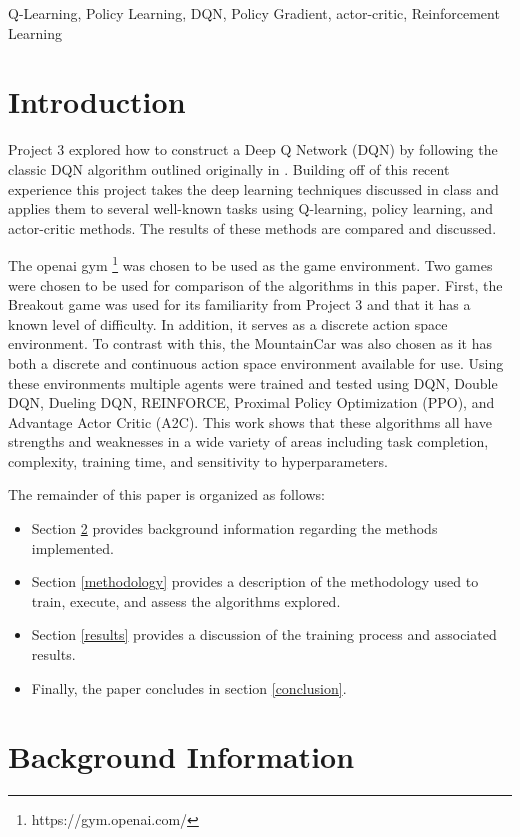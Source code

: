 \documentclass[conference]{IEEEtran}
\begin{document}
\begin{IEEEkeywords}
Q-Learning, Policy Learning, DQN, Policy Gradient, actor-critic, Reinforcement Learning
\end{IEEEkeywords}

\section{Introduction}
Project 3 explored how to construct a Deep Q Network (DQN) by following the classic DQN algorithm outlined originally in \cite{DQNOriginalPaper}.
Building off of this recent experience this project takes the deep learning techniques discussed in class and applies them to several well-known tasks using Q-learning, policy learning, and actor-critic methods.
The results of these methods are compared and discussed.

The openai gym \footnote{https://gym.openai.com/} was chosen to be used as the game environment.
Two games were chosen to be used for comparison of the algorithms in this paper.
First, the Breakout game was used for its familiarity from Project 3 and that it has a known level of difficulty.
In addition, it serves as a discrete action space environment.
To contrast with this, the MountainCar was also chosen as it has both a discrete and continuous action space environment available for use.
Using these environments multiple agents were trained and tested using DQN, Double DQN, Dueling DQN, REINFORCE, Proximal Policy Optimization (PPO), and Advantage Actor Critic (A2C).
This work shows that these algorithms all have strengths and weaknesses in a wide variety of areas including task completion, complexity, training time, and sensitivity to hyperparameters.

The remainder of this paper is organized as follows:
\begin{itemize}
\item Section \ref{background} provides background information regarding the methods implemented.
\item Section \ref{methodology} provides a description of the methodology used to train, execute, and assess the algorithms explored.
\item Section \ref{results} provides a discussion of the training process and associated results.
\item Finally, the paper concludes in section \ref{conclusion}.
\end{itemize}

\section{Background Information} \label{background}
\end{document}
